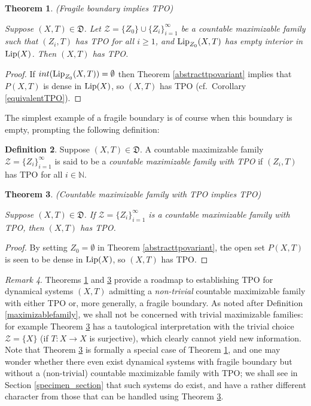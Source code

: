 \documentclass[reqno,11pt]{amsart}
\newtheorem{thm}{Theorem}[section]
\theoremstyle{definition}
\newtheorem{defn}[thm]{Definition}
\theoremstyle{remark}
\theoremstyle{remark}
\newtheorem{rem}[thm]{Remark}
\def \N {\mathbb N}
\def\lip{{\rm Lip}}
\def\ZZ{\mathcal{Z}}
\def\D{\mathfrak{D}}
\numberwithin{equation}{section}
\begin{document}
\begin{thm}\label{fragile_boundary_theorem} (Fragile boundary implies TPO)

\noindent
Suppose $(X,T)\in\D$.
Let $\ZZ=\{Z_0\} \cup \{Z_i\}_{i=1}^\infty$ be a countable maximizable family
 such that $(Z_i,T)$ has TPO for all $i\ge1$,
and $\lip_{Z_0}(X,T)$ has empty interior in $\lip(X)$.
Then $(X,T)$ has TPO.
\end{thm}
\begin{proof}
If $int(\lip_{Z_0}(X,T))=\emptyset$ then Theorem \ref{abstracttpovariant} implies that $P(X,T)$ is dense in
$\lip(X)$, so $(X,T)$ has TPO (cf.~Corollary \ref{equivalentTPO}).
\end{proof}

The simplest example of a fragile boundary is of course when this boundary is empty, 
prompting the following definition:

\begin{defn}\label{CMFTPO}
Suppose $(X,T)\in\D$.
A countable maximizable family $\ZZ=\{Z_i\}_{i=1}^\infty$ is said to be a
\emph{countable maximizable family with TPO} 
if
$(Z_i,T)$ has
TPO
for all $i\in\N$.
\end{defn}


\begin{thm}\label{abstracttpo} (Countable maximizable family with TPO implies TPO)

\noindent Suppose $(X,T)\in\D$.
If $\ZZ=\{Z_i\}_{i=1}^\infty$ is a countable maximizable family with TPO,
then $(X,T)$ has TPO. 
\end{thm}
\begin{proof}
By setting
$Z_0=\emptyset$
in  Theorem  \ref{abstracttpovariant},
the open set $P(X,T)$ is seen to be dense in $\lip(X)$,
so $(X,T)$ has TPO.
\end{proof}

\begin{rem}\label{non_trivial_CMF}
Theorems \ref{fragile_boundary_theorem} and \ref{abstracttpo} provide a roadmap to establishing TPO for dynamical systems $(X,T)$ admitting a \emph{non-trivial} countable maximizable family with either TPO or, more generally, a fragile boundary.
As noted after Definition \ref{maximizablefamily}, we shall not be concerned with trivial maximizable families: for example
Theorem \ref{abstracttpo} has a tautological interpretation with the trivial choice $\ZZ=\{X\}$
(if $T:X\to X$ is surjective), which clearly cannot yield new information. Note that Theorem \ref{abstracttpo} is formally a special case of Theorem \ref{fragile_boundary_theorem},
and one may wonder whether there even exist dynamical systems with fragile boundary but without a (non-trivial) countable maximizable family with TPO;
we shall see in Section \ref{specimen_section} that such systems do exist, and have a rather different character from those
that can be handled using Theorem \ref{abstracttpo}. 
\end{rem}
\end{document}

